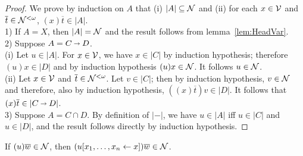 \documentclass{llncs} %
\begin{document}
\begin{proof}
We prove by induction on $A$ that (i) $ |A| \subseteq  \mathcal{N}$ and (ii) for each $x\in \mathcal{V}$ and $\overline{t} \in \mathcal{N}^{<\omega}$, $(x)\overline{t} \in |A|$.
\\
1) If $A=X$, then $|A| =\mathcal{N}$ and the result follows from lemma~\ref{lem:HeadVar}.
\\
2) Suppose $A=C\vlim D$. 
\\
(i) Let $u \in |A|$. For $x \in \mathcal{V}$, we have $x\in |C|$ by induction hypothesis; therefore $(u)x \in |D|$ and by induction hypothesis $(u)x \in \mathcal{N}$. It follows  $u \in \mathcal{N}$.
\\
(ii) Let $x\in \mathcal{V}$ and $\overline{t} \in \mathcal{N}^{<\omega}$. Let $v\in |C|$; then by induction hypothesis,  $v\in \mathcal{N}$ and therefore, also by induction hypothesis, $((x)\overline{t})v \in |D|$. It follows that $(x)\overline{t} \in |C \vlim D|$.
\\
3) Suppose $A=C \cap D$. By definition of $|-|$, we have $u\in |A|$ iff $u\in |C|$ and $u\in |D|$, and the result follows directly by induction hypothesis.
\end{proof}

\begin{lemma}\label{lem:SN-AddSharings}
If $(u)\overline{w} \in \mathcal{N}$, then $(u\share xx)\overline{w} \in \SN$.
\end{lemma} 
\end{document}
